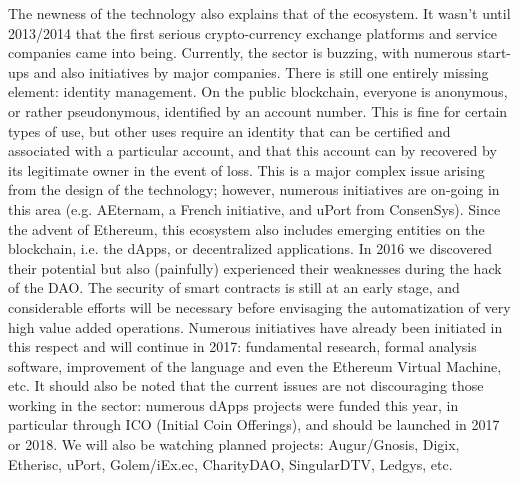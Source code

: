 \documentclass{tnreport}
\begin{document}
The newness of the technology also explains that of the ecosystem. It wasn’t until 2013/2014 that the first serious crypto-currency exchange platforms and service companies came into being. Currently, the sector is buzzing, with numerous start-ups and also initiatives by major companies. There is still one entirely missing element: identity management. On the public blockchain, everyone is anonymous, or rather pseudonymous, identified by an account number. This is fine for certain types of use, but other uses require an identity that can be certified and associated with a particular account, and that this account can by recovered by its legitimate owner in the event of loss. This is a major complex issue arising from the design of the technology; however, numerous initiatives are on-going in this area (e.g. AEternam, a French initiative, and uPort from ConsenSys).
Since the advent of Ethereum, this ecosystem also includes emerging entities on the blockchain, i.e. the dApps, or decentralized applications. In 2016 we discovered their potential but also (painfully) experienced their weaknesses during the hack of the DAO. The security of smart contracts is still at an early stage, and considerable efforts will be necessary before envisaging the automatization of very high value added operations. Numerous initiatives have already been initiated in this respect and will continue in 2017: fundamental research, formal analysis software, improvement of the language and even the Ethereum Virtual Machine, etc. It should also be noted that the current issues are not discouraging those working in the sector: numerous dApps projects were funded this year, in particular through ICO (Initial Coin Offerings), and should be launched in 2017 or 2018. We will also be watching planned projects: Augur/Gnosis, Digix, Etherisc, uPort, Golem/iEx.ec, CharityDAO, SingularDTV, Ledgys, etc.
\end{document}
